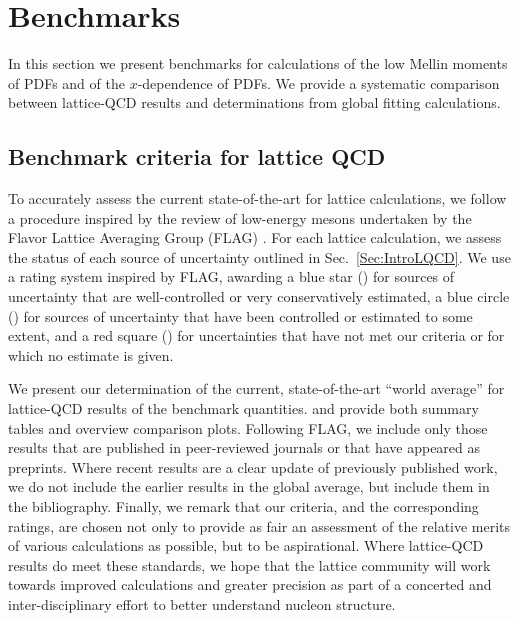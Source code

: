 \section{Benchmarks}
\label{sec:benchmarking}

In this section we present benchmarks for calculations of the low 
Mellin moments of PDFs and of the $x$-dependence of PDFs. We provide a systematic
comparison between lattice-QCD results and determinations from global fitting
calculations.
%
\subsection{Benchmark criteria for lattice QCD}
To accurately assess the current state-of-the-art for lattice calculations, we
follow a procedure inspired by the review of low-energy mesons undertaken 
by the Flavor Lattice Averaging Group (FLAG) \cite{Aoki:2016frl}. For each
lattice calculation, we assess the status of each source of uncertainty outlined
in Sec.~\ref{Sec:IntroLQCD}. We use a rating system inspired by FLAG, awarding a
blue star (\bstar) for sources of uncertainty that are well-controlled or very conservatively
estimated, a blue circle (\bcirc) for sources of uncertainty that have been controlled or estimated to some extent,
and a red square (\rsquare) for uncertainties that have not met our criteria or for which no estimate is given.

We present our determination of the current, state-of-the-art
``world average'' for lattice-QCD results of the benchmark quantities. and 
provide both summary tables and overview comparison plots. Following FLAG, we include only those results that
are published in peer-reviewed journals or that have appeared as preprints. Where
recent results are a clear update of previously published work, we do not 
include the earlier results in the global average, but include them in the bibliography. Finally,
we remark that our criteria, and the corresponding ratings, are chosen not only
to provide as fair an assessment of the relative merits of various calculations as
possible, but to be aspirational. Where lattice-QCD results do meet these
standards, we hope that the lattice community will work towards improved calculations
and greater precision as part of a concerted and inter-disciplinary effort to better understand
nucleon structure.
%

